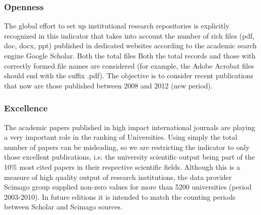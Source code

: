 \subsubsection{Openness}
\noindent
The global effort to set up institutional research repositories is explicitly recognized in this indicator that takes into account the number of rich files (pdf, doc, docx, ppt) published in dedicated websites according to the academic search engine Google Scholar. Both the total files Both the total records and those with correctly formed file names are considered (for example, the Adobe Acrobat files should end with the suffix .pdf). The objective is to consider recent publications that now are those published between 2008 and 2012 (new period).

\subsubsection{Excellence}
\noindent
The academic papers published in high impact international journals are playing a very important role in the ranking of Universities. Using simply the total number of papers can be misleading, so we are restricting the indicator to only those excellent publications, i.e. the university scientific output being part of the 10\% most cited papers in their respective scientific fields. Although this is a measure of high quality output of research institutions, the data provider Scimago group supplied non-zero values for more than 5200 universities (period 2003-2010). In future editions it is intended to match the counting periods between Scholar and Scimago sources.

